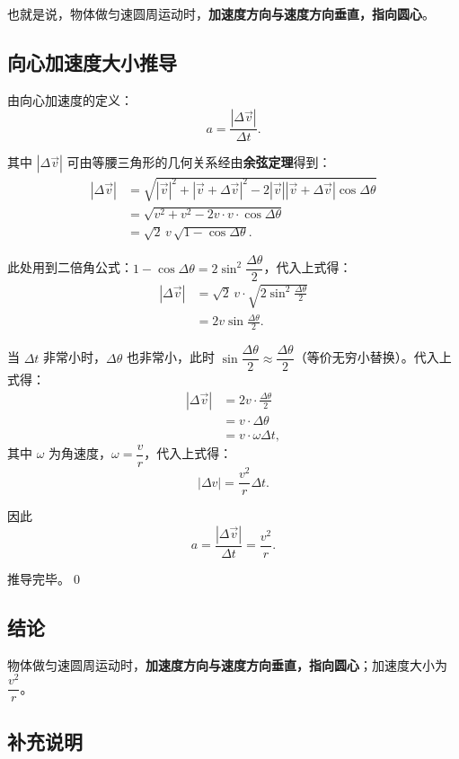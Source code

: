 \documentclass[12pt,a4paper]{article}
\begin{document}
也就是说，物体做匀速圆周运动时，\textbf{加速度方向与速度方向垂直，指向圆心}。

\subsection{向心加速度大小推导}

由向心加速度的定义：
\[
a = \frac{|\Delta\vec{v}|}{\Delta t}.
\]

其中 $|\Delta\vec{v}|$ 可由等腰三角形的几何关系经由\textbf{余弦定理}得到：
\[
\begin{aligned}
|\Delta\vec{v}|
&= \sqrt{|\vec{v}|^2 + |\vec{v}+\Delta\vec{v}|^2 - 2|\vec{v}||\vec{v}+\Delta\vec{v}|\cos\Delta\theta} \\[4pt]
&= \sqrt{v^2 + v^2 - 2v\cdot v\cdot\cos\Delta\theta} \\[4pt]
&= \sqrt{2}\,v\,\sqrt{1-\cos\Delta\theta}.
\end{aligned}
\]

此处用到二倍角公式：$1-\cos\Delta\theta = 2\sin^2\dfrac{\Delta\theta}{2}$，代入上式得：
\[
\begin{aligned}
|\Delta\vec{v}|
&= \sqrt{2}\,v\cdot\sqrt{2\sin^2\frac{\Delta\theta}{2}} \\[4pt]
&= 2v\sin\frac{\Delta\theta}{2}.
\end{aligned}
\]

当 $\Delta t$ 非常小时，$\Delta\theta$ 也非常小，此时 $\sin\dfrac{\Delta\theta}{2}\approx\dfrac{\Delta\theta}{2}$（等价无穷小替换）。代入上式得：
\[
\begin{aligned}
|\Delta\vec{v}|
&= 2v\cdot\frac{\Delta\theta}{2} \\[4pt]
&= v\cdot\Delta\theta \\[4pt]
&= v\cdot\omega\Delta t,
\end{aligned}
\]
其中 $\omega$ 为角速度，$\omega = \dfrac{v}{r}$，代入上式得：
\[
|\Delta v| = \frac{v^2}{r}\Delta t.
\]

因此
\[
\boxed{a = \frac{|\Delta\vec{v}|}{\Delta t} = \frac{v^2}{r}}.
\]

推导完毕。\qed

\subsection{结论}

物体做匀速圆周运动时，\textbf{加速度方向与速度方向垂直，指向圆心}；加速度大小为 $\dfrac{v^2}{r}$。

\subsection{补充说明}
\end{document}
